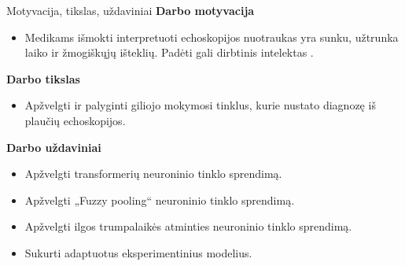 \documentclass{VUMIFSlides}
\begin{document}
\begin{frame}[c]{Motyvacija, tikslas, uždaviniai}{}
    {\bf Darbo motyvacija}
    \begin{itemize}
        \item Medikams išmokti interpretuoti echoskopijos nuotraukas yra sunku, užtrunka laiko ir žmogiškųjų išteklių. Padėti gali dirbtinis intelektas \cite{cammarota2023lung}.
    \end{itemize}
    
    \vspace{0.35 cm}
    {\bf Darbo tikslas}
    \begin{itemize}
        \item Apžvelgti ir palyginti giliojo mokymosi tinklus, kurie nustato diagnozę iš plaučių echoskopijos.
    \end{itemize}
    
    \vspace{0.35 cm}
    {\bf Darbo uždaviniai}
    \begin{itemize}
        \item Apžvelgti transformerių neuroninio tinklo sprendimą.
        \item Apžvelgti „Fuzzy pooling“ neuroninio tinklo sprendimą.
        \item Apžvelgti ilgos trumpalaikės atminties neuroninio tinklo sprendimą.
        \item Sukurti adaptuotus eksperimentinius modelius.
    \end{itemize}
\end{frame}
\end{document}
